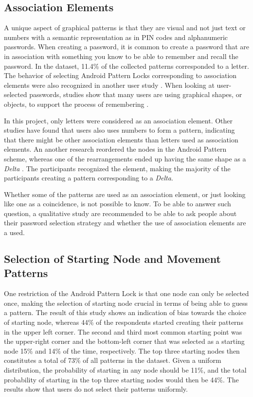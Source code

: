     \subsection{Association Elements}
      A unique aspect of graphical patterns is that they are visual and not just text or numbers with a semantic representation as in PIN codes and alphanumeric passwords. When creating a password, it is common to create a password that are in association with something you know to be able to remember and recall the password. In the dataset, 11.4\% of the collected patterns corresponded to a letter. The behavior of selecting Android Pattern Locks corresponding to association elements were also recognized in another user study \cite{Sun}. When looking at user-selected passwords, studies show that many users are using graphical shapes, or objects, to support the process of remembering \cite{Weiss}. 

      In this project, only letters were considered as an association element. Other studies have found that users also uses numbers to form a pattern, indicating that there might be other association elements than letters used as association elements. An another research reordered the nodes in the Android Pattern scheme, whereas one of the rearrangements ended up having the same shape as a {\it Delta} \cite{Uellenbeck}. The participants recognized the element, making the majority of the participants creating a pattern corresponding to a {\it Delta}. 

      Whether some of the patterns are used as an association element, or just looking like one as a coincidence, is not possible to know. To be able to answer such question, a qualitative study are recommended to be able to ask people about their password selection strategy and whether the use of association elements are a used. 

    \subsection{Selection of Starting Node and Movement Patterns}
      One restriction of the Android Pattern Lock is that one node can only be selected once, making the selection of starting node crucial in terms of being able to guess a pattern. The result of this study shows an indication of bias towards the choice of starting node, whereas 44\% of the respondents started creating their patterns in the upper left corner. The second and third most common starting point was the upper-right corner and the bottom-left corner that was selected as a starting node 15\% and 14\% of the time, respectively. The top three starting nodes then constitutes a total of 73\% of all patterns in the dataset. Given a uniform distribution, the probability of starting in any node should be 11\%, and the total probability of starting in the top three starting nodes would then be 44\%. The results show that users do not select their patterns uniformly.

